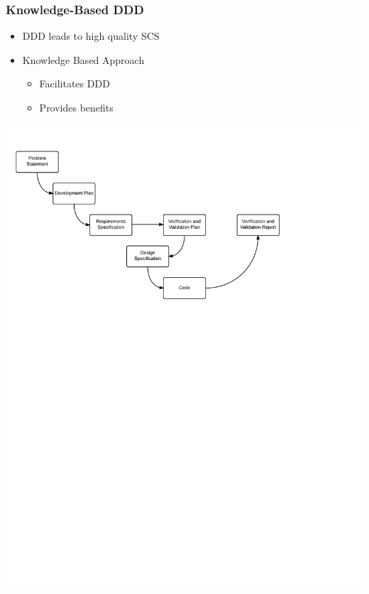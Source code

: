 \documentclass{beamer}
\begin{document}
\begin{frame}

\frametitle{Knowledge-Based DDD}

\begin{itemize}
\item DDD leads to high quality SCS
\item Knowledge Based Approach
\begin{itemize}
\item Facilitates DDD
\item Provides benefits
\end{itemize}
\end{itemize}

\begin{center}
\includegraphics[scale=0.55]{OverviewOfProcess.pdf}
\end{center}

\end{frame}

\end{document}
